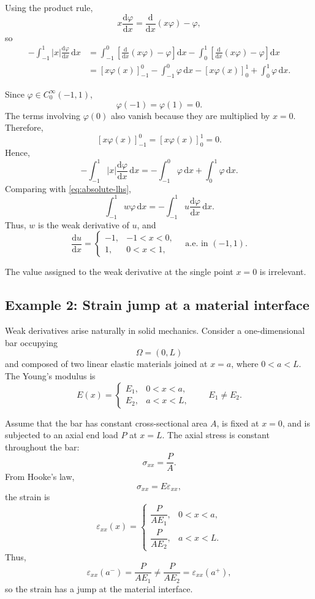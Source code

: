 \documentclass[11pt]{article}
\newcommand{\Om}{\Omega}
\newcommand{\dd}{\mathrm{d}}
\begin{document}
Using the product rule,
\[
x\frac{\dd\varphi}{\dd x}
=
\frac{\dd}{\dd x}(x\varphi)-\varphi,
\]
so
\begin{align}
-\int_{-1}^{1}|x|\frac{\dd\varphi}{\dd x}\,\dd x
&=
\int_{-1}^{0}
\left[
\frac{\dd}{\dd x}(x\varphi)-\varphi
\right]\dd x
-
\int_{0}^{1}
\left[
\frac{\dd}{\dd x}(x\varphi)-\varphi
\right]\dd x
\nonumber\\
&=
\left[x\varphi(x)\right]_{-1}^{0}
-\int_{-1}^{0}\varphi\,\dd x
-\left[x\varphi(x)\right]_{0}^{1}
+\int_{0}^{1}\varphi\,\dd x.
\label{eq:absolute-rhs-2}
\end{align}

Since $\varphi\in C_0^\infty(-1,1)$,
\[
\varphi(-1)=\varphi(1)=0.
\]
The terms involving $\varphi(0)$ also vanish because they are
multiplied by $x=0$. Therefore,
\[
\left[x\varphi(x)\right]_{-1}^{0}
=
\left[x\varphi(x)\right]_{0}^{1}
=
0.
\]
Hence,
\[
-\int_{-1}^{1}|x|\frac{\dd\varphi}{\dd x}\,\dd x
=
-\int_{-1}^{0}\varphi\,\dd x
+
\int_{0}^{1}\varphi\,\dd x.
\]
Comparing with \eqref{eq:absolute-lhs},
\[
\int_{-1}^{1}w\varphi\,\dd x
=
-\int_{-1}^{1}u\frac{\dd\varphi}{\dd x}\,\dd x.
\]
Thus, $w$ is the weak derivative of $u$, and
\[
\boxed{
\frac{\dd u}{\dd x}
=
\begin{cases}
-1, & -1<x<0,\\[2mm]
 1, & 0<x<1,
\end{cases}
\quad\text{a.e. in }(-1,1).
}
\]

The value assigned to the weak derivative at the single point $x=0$
is irrelevant.

\subsection*{Example 2: Strain jump at a material interface}

Weak derivatives arise naturally in solid mechanics. Consider a
one-dimensional bar occupying
\[
\Om=(0,L)
\]
and composed of two linear elastic materials joined at $x=a$, where
$0<a<L$. The Young's modulus is
\[
E(x)=
\begin{cases}
E_1, & 0<x<a,\\[2mm]
E_2, & a<x<L,
\end{cases}
\qquad
E_1\neq E_2.
\]

Assume that the bar has constant cross-sectional area $A$, is fixed
at $x=0$, and is subjected to an axial end load $P$ at $x=L$.
The axial stress is constant throughout the bar:
\[
\sigma_{xx}=\frac{P}{A}.
\]
From Hooke's law,
\[
\sigma_{xx}=E\varepsilon_{xx},
\]
the strain is
\[
\varepsilon_{xx}(x)=
\begin{cases}
\dfrac{P}{AE_1}, & 0<x<a,\\[3mm]
\dfrac{P}{AE_2}, & a<x<L.
\end{cases}
\]
Thus,
\[
\varepsilon_{xx}(a^-)
=
\frac{P}{AE_1}
\neq
\frac{P}{AE_2}
=
\varepsilon_{xx}(a^+),
\]
so the strain has a jump at the material interface.
\end{document}
